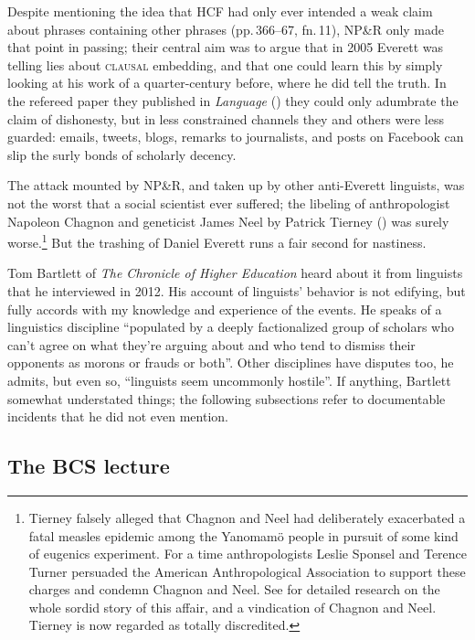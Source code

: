 \documentclass[output=paper,colorlinks,citecolor=brown
]{langscibook}
\begin{document}
Despite mentioning the idea that HCF had only ever intended a weak
claim about phrases containing other phrases (pp.\,366--67, fn.\,11),
NP\&R only made that point in passing; their central aim was to argue
that in 2005 Everett was telling lies about \textsc{clausal} embedding,
and that one could learn this by simply looking at his work of a
quarter-century before, where he did tell the truth. In the refereed
paper they published in \textit{Language} (\citeyear{NevPesRod09a})
they could only adumbrate the claim of dishonesty, but in less
constrained channels they and others were less guarded: emails, tweets,
blogs, remarks to journalists, and posts on Facebook can slip the
surly bonds of scholarly decency.

The attack mounted by NP\&R, and taken up by other anti-Everett
linguists, was not the worst that a social scientist ever suffered;
the libeling of anthropologist Napoleon Chagnon and geneticist James
Neel by Patrick Tierney (\citeyear{Tierney00}) was surely
worse.\footnote{\label{tierney}
   Tierney falsely alleged that Chagnon and Neel had deliberately
   exacerbated a fatal measles epidemic among the Yanomam{\"o} people
   in pursuit of some kind of eugenics experiment. For a time
   anthropologists Leslie Sponsel and Terence Turner persuaded the
   American Anthropological Association to support these charges and
   condemn Chagnon and Neel. See \citet{Dreger11} for detailed
   research on the whole sordid story of this affair, and a vindication
   of Chagnon and Neel. Tierney is now regarded as totally discredited.}
But the trashing of Daniel Everett runs a fair second for nastiness.

Tom Bartlett of \textit{The Chronicle of Higher Education} heard
about it from linguists that he interviewed in 2012. His account of
linguists' behavior \citep{Bartlett12} is not edifying, but fully
accords with my knowledge and experience of the events. He speaks
of a linguistics discipline ``populated by a deeply factionalized
group of scholars who can't agree on what they're arguing about
and who tend to dismiss their opponents as morons or frauds or both''.
Other disciplines have disputes too, he admits, but even so,
``linguists seem uncommonly hostile''. If anything, Bartlett somewhat
understated things; the following subsections refer to documentable
incidents that he did not even mention.

\subsection{The BCS lecture}\label{river}
\end{document}
